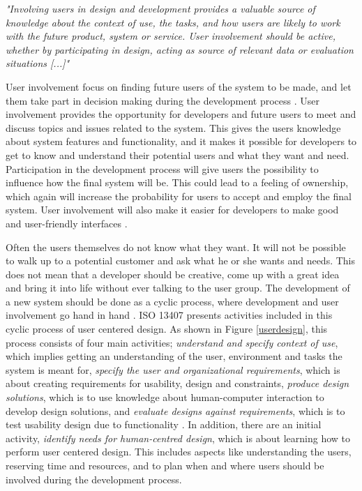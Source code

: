 \emph{"Involving users in design and development provides a valuable source of knowledge about the context of use, the tasks, and how users are likely to work with the future product, system or service. User involvement should be active, whether by participating in design, acting as source of relevant data or evaluation situations [...]"}

User involvement focus on finding future users of the system to be made, and let them take part in decision making during the development process \cite{bjerknes1995user}. User involvement provides the opportunity for developers and future users to meet and discuss topics and issues related to the system. This gives the users knowledge about system features and functionality, and it makes it possible for developers to get to know and understand their potential users and what they want and need. Participation in the development process will give users the possibility to influence how the final system will be. This could lead to a feeling of ownership, which again will increase the probability for users to accept and employ the final system. User involvement will also make it easier for developers to make good and user-friendly interfaces \cite{infodesign} \cite{mmi}. 

Often the users themselves do not know what they want. It will not be possible to walk up to a potential customer and ask what he or she wants and needs. This does not mean that a developer should be creative, come up with a great idea and bring it into life without ever talking to the user group. The development of a new system should be done as a cyclic process, where development and user involvement go hand in hand \cite{mmi}. ISO 13407 presents activities included in this cyclic process of user centered design. As shown in Figure \ref{userdesign}, this process consists of four main activities; \emph{understand and specify context of use}, which implies getting an understanding of the user, environment and tasks the system is meant for, \emph{specify the user and organizational requirements}, which is about creating requirements for usability, design and constraints, \emph{produce design solutions}, which is to use knowledge about human-computer interaction to develop design solutions, and \emph{evaluate designs against requirements}, which is to test usability design due to functionality \cite{jokela2003standard}. In addition, there are an initial activity, \emph{identify needs for human-centred design}, which is about learning how to perform user centered design. This includes aspects like understanding the users, reserving time and resources, and to plan when and where users should be involved during the development process. 

